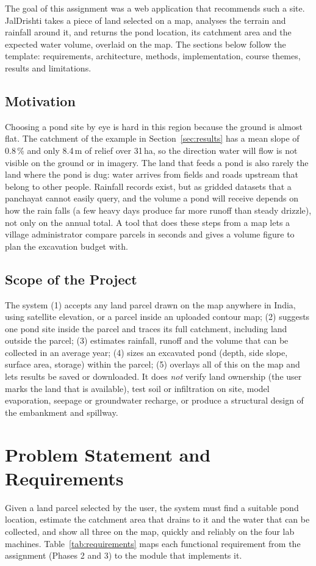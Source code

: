 \documentclass[manuscript,screen,review]{acmart}
\begin{document}
The goal of this assignment was a web application that recommends such a site. JalDrishti
takes a piece of land selected on a map, analyses the terrain and rainfall around it, and
returns the pond location, its catchment area and the expected water volume, overlaid on the
map. The sections below follow the template: requirements, architecture, methods, implementation,
course themes, results and limitations.

\subsection{Motivation}
Choosing a pond site by eye is hard in this region because the ground is almost flat. The
catchment of the example in Section~\ref{sec:results} has a mean slope of 0.8\,\% and only
8.4\,m of relief over 31\,ha, so the direction water will flow is not visible on the ground or in
imagery. The land that feeds a pond is also rarely the land where the pond is dug: water arrives
from fields and roads upstream that belong to other people. Rainfall records exist, but as
gridded datasets that a panchayat cannot easily query, and the volume a pond will receive depends
on how the rain falls (a few heavy days produce far more runoff than steady drizzle), not only on
the annual total. A tool that does these steps from a map lets a village administrator compare
parcels in seconds and gives a volume figure to plan the excavation budget with.

\subsection{Scope of the Project}
The system (1) accepts any land parcel drawn on the map anywhere in India, using satellite
elevation, or a parcel inside an uploaded contour map; (2) suggests one pond site inside the
parcel and traces its full catchment, including land outside the parcel; (3) estimates rainfall,
runoff and the volume that can be collected in an average year; (4) sizes an excavated pond
(depth, side slope, surface area, storage) within the parcel; (5) overlays all of this on the map
and lets results be saved or downloaded. It does \emph{not} verify land ownership (the user marks
the land that is available), test soil or infiltration on site, model evaporation, seepage or
groundwater recharge, or produce a structural design of the embankment and spillway.

\section{Problem Statement and Requirements}
\label{sec:requirements}
Given a land parcel selected by the user, the system must find a suitable pond location, estimate
the catchment area that drains to it and the water that can be collected, and show all three on
the map, quickly and reliably on the four lab machines. Table~\ref{tab:requirements} maps each
functional requirement from the assignment (Phases 2 and 3) to the module that implements it.
\end{document}
